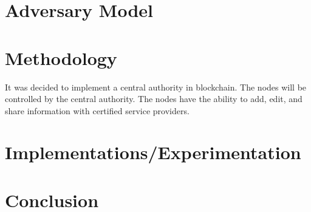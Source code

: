 \documentclass[letterpaper, 10 pt, conference]{ieeeconf}  %
\begin{document}
\section{Adversary Model}

\section{Methodology}

It was decided to implement a central authority in blockchain. The nodes will be controlled by the central authority. The nodes have the ability to add, edit, and share information with certified service providers. 

\section{Implementations/Experimentation}

\section{Conclusion}



\end{document}
